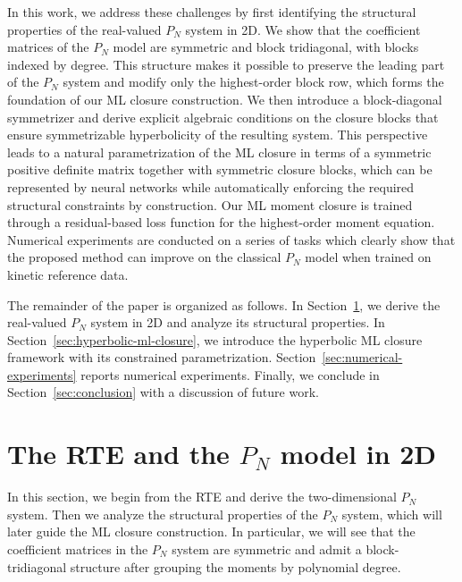 \documentclass[11pt]{article}
\numberwithin{equation}{section}
\begin{document}
In this work, we address these challenges by first identifying the structural properties of the real-valued $P_N$ system in 2D. We show that the coefficient matrices of the $P_N$ model are symmetric and block tridiagonal, with blocks indexed by degree. This structure makes it possible to preserve the leading part of the $P_N$ system and modify only the highest-order block row, which forms the foundation of our ML closure construction. We then introduce a block-diagonal symmetrizer and derive explicit algebraic conditions on the closure blocks that ensure symmetrizable hyperbolicity of the resulting system. This perspective leads to a natural parametrization of the ML closure in terms of a symmetric positive definite matrix together with symmetric closure blocks, which can be represented by neural networks while automatically enforcing the required structural constraints by construction.
Our ML moment closure is trained through a residual-based loss function for the highest-order moment equation. Numerical experiments are conducted on a series of tasks which clearly show that the proposed method can improve on the classical $P_N$ model when trained on kinetic reference data. 

The remainder of the paper is organized as follows. In Section~\ref{sec:pn-2d}, we derive the real-valued $P_N$ system in 2D and analyze its structural properties. In Section~\ref{sec:hyperbolic-ml-closure}, we introduce the hyperbolic ML closure framework with its constrained parametrization. Section~\ref{sec:numerical-experiments} reports numerical experiments. Finally, we conclude in Section~\ref{sec:conclusion} with a discussion of future work.


\section{The RTE and the \texorpdfstring{$P_N$}{PN} model in 2D}\label{sec:pn-2d}

In this section, we begin from the RTE and derive the two-dimensional
$P_N$ system. Then we analyze the structural properties of the $P_N$ system, which will later guide the ML closure construction. In particular, we will see that the coefficient matrices in the $P_N$ system are symmetric and admit a block-tridiagonal structure after grouping the moments by polynomial degree. 
\end{document}
